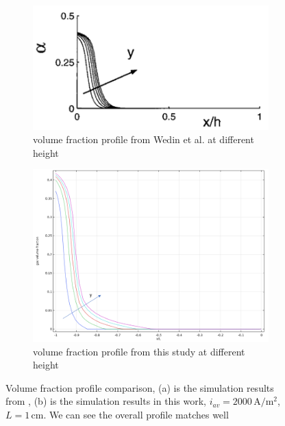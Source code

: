 \begin{figure}
\centering
\begin{subfigure}{1\textwidth}
  \centering
  \includegraphics[width=1\linewidth]{Wedinvolumeprofile.png}
  \caption{volume fraction profile from Wedin et al. \cite{Wedin2001} at different height}
  \label{Wedinprofile}
\end{subfigure}%

\begin{subfigure}{1\textwidth}
  \centering
  \includegraphics[width=1\linewidth]{myvolumeprofile.png}
  \caption{volume fraction profile from this study at different height}
  \label{myprofile}
\end{subfigure}
\caption{Volume fraction profile comparison, (a) is the simulation results from \cite{Wedin2001}, (b) is the simulation results in this work, $i_{av} = 2000 \,  \mathrm{A/m^2}$, $L =  1 \, \mathrm{cm}$. We can see the overall profile matches well}
\label{volumefractioncomparison}
\end{figure}

